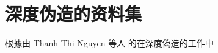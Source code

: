 \chapter{深度伪造的资料集}
\label{chap:3}


根據由 Thanh Thi Nguyen 等人 \cite{https://doi.org/10.48550/arxiv.1909.11573}的在深度偽造的工作中

